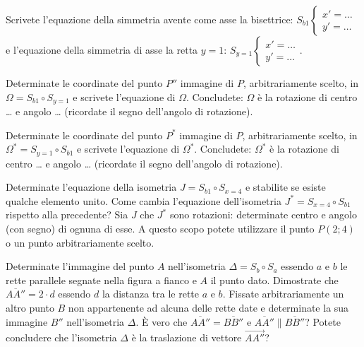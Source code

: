 \begin{esercizio}
\label{ese:8.70} %
Scrivete l'equazione della simmetria avente come asse la bisettrice: $S_{b1}\begin{cases}x'=\ldots{}\\y'=\ldots{}\end{cases}$ e l'equazione della simmetria di asse la retta $y=1$: $S_{y=1}\begin{cases}x'=\ldots{}\\y'=\ldots{}\end{cases}$.
\end{esercizio}

\begin{esercizio}
\label{ese:8.71} %
Determinate le coordinate del punto $P''$ immagine di $P$, arbitrariamente scelto, in $\Omega = S_{b1} \circ S_{y=1}$ e scrivete l'equazione di $\Omega$.
Concludete: $\Omega$ è la rotazione di centro \ldots{} e angolo \ldots{} (ricordate il segno dell'angolo di rotazione).
\end{esercizio}

\begin{esercizio}
\label{ese:8.72} %
Determinate le coordinate del punto $P^*$ immagine di $P$, arbitrariamente scelto, in $\Omega^*=S_{y=1} \circ S_{b1}$ e scrivete l'equazione di $\Omega^*$.
Concludete: $\Omega^*$ è la rotazione di centro \ldots{} e angolo \ldots{} (ricordate il segno dell'angolo di rotazione).
\end{esercizio}

\begin{esercizio}
\label{ese:8.73} %
Determinate l'equazione della isometria $J=S_{b1} \circ S_{x=4}$ e stabilite se esiste qualche elemento unito. Come cambia l'equazione dell'isometria $J^*=S_{x=4} \circ S_{b1}$ rispetto alla precedente? Sia $J$ che $J^*$ sono rotazioni: determinate centro e angolo (con segno) di ognuna di esse. A questo scopo potete utilizzare il punto $P(2;4)$ o un punto arbitrariamente scelto.
\end{esercizio}

\noindent\begin{minipage}{0.7\textwidth}\parindent15pt
\begin{esercizio}
\label{ese:8.74} %
Determinate l'immagine del punto $A$ nell'isometria $\Delta=S_b \circ S_a$ essendo $a$ e $b$ le rette parallele segnate nella figura a fianco e $A$ il punto dato. Dimostrate che $\overline{AA''}=2\cdot d$ essendo $d$ la distanza tra le rette $a$ e $b$.
Fissate arbitrariamente un altro punto $B$ non appartenente ad alcuna delle rette date e determinate la sua immagine $B''$ nell'isometria $\Delta$.
\`E vero che $\overline{AA''}=\overline{BB''}$ e $\overline{AA''} \parallel \overline{BB''}$? Potete concludere che l'isometria $\Delta$ è la traslazione di vettore $\overrightarrow{AA''}$?
\end{esercizio}
\end{minipage}\hfil
\begin{minipage}{0.3\textwidth}
	\centering~~
\end{minipage}\vspace{8pt}

